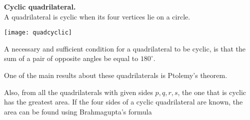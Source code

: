 \documentclass[12pt]{article}
\begin{document}
\textbf{Cyclic quadrilateral.}\\
A quadrilateral is cyclic when its four vertices lie on a circle.

\begin{center}
\texttt{[image: quadcyclic]}
\end{center}

A necessary and sufficient condition for a quadrilateral to be cyclic, is that the sum of a pair of opposite angles be equal to $180^\circ$.

One of the main results about these quadrilaterals is Ptolemy's theorem.

Also, from all the quadrilaterals with given sides $p,q,r,s$, the one that is cyclic has the greatest area. If the four sides of a cyclic quadrilateral are known, the area can be found using Brahmagupta's formula
\end{document}
